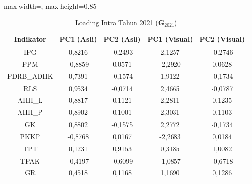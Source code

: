 \begin{table}[H]
\centering
\caption{Loading Intra Tahun 2021 ($\mathbf{G}_{2021}$)} \label{tab:app1loading_intra_2021}
\begin{adjustbox}{max width=\textwidth, max height=0.85\textheight}
\begin{tabular}{|c|c|c|c|c|}
\hline
\textbf{Indikator} & \textbf{PC1 (Asli)} & \textbf{PC2 (Asli)} & \textbf{PC1 (Visual)} & \textbf{PC2 (Visual)} \\
\hline
IPG & 0,8216 & -0,2493 & 2,1257 & -0,2746 \\
PPM & -0,8859 & 0,0571 & -2,2920 & 0,0628 \\
PDRB\_ADHK & 0,7391 & -0,1574 & 1,9122 & -0,1734 \\
RLS & 0,9534 & -0,0714 & 2,4665 & -0,0787 \\
AHH\_L & 0,8817 & 0,1121 & 2,2811 & 0,1235 \\
AHH\_P & 0,8902 & 0,1001 & 2,3031 & 0,1103 \\
GK & 0,8802 & -0,1575 & 2,2772 & -0,1734 \\
PKKP & -0,8768 & 0,0167 & -2,2683 & 0,0184 \\
TPT & 0,1231 & 0,9153 & 0,3185 & 1,0082 \\
TPAK & -0,4197 & -0,6099 & -1,0857 & -0,6718 \\
GR & 0,4518 & 0,1168 & 1,1690 & 0,1286 \\
\hline
\end{tabular}
\end{adjustbox}
\end{table}